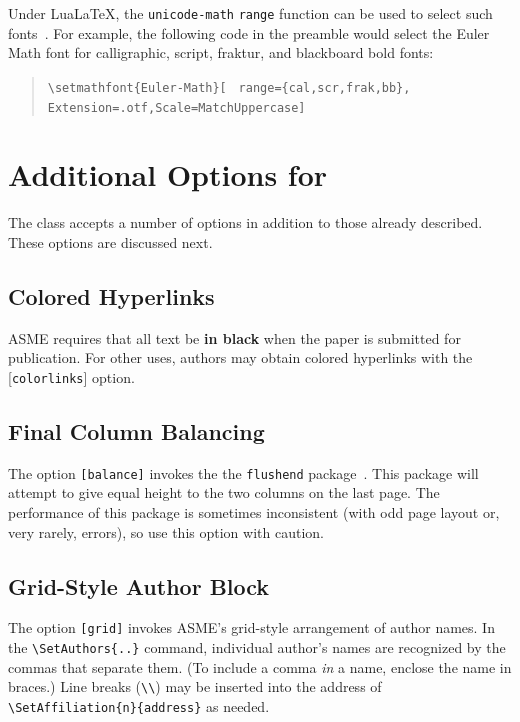 \documentclass[colorlinks,upint,subscriptcorrection,varvw,balance,loadscripts,german,vietamese]{asmeconf} %
\newcommand*\LuaLaTeX{Lua\LaTeX}
\begin{document}
Under \LuaLaTeX, the \texttt{unicode-math} \texttt{range} function can be used to select such fonts~\cite{robertson2023}. For example, the following code in the preamble would select the Euler Math font for calligraphic, script, fraktur, and blackboard bold fonts:
\begin{quote}\raggedright
\verb|\setmathfont{Euler-Math}[|
\verb| range={cal,scr,frak,bb},|
\verb| Extension=.otf,Scale=MatchUppercase]|
\end{quote}



\section{Additional Options for }
The class accepts a number of options in addition to those already described. These options are discussed next.

\subsection{Colored Hyperlinks}
ASME requires that all text be \textbf{in black} when the paper is submitted for publication.  For other uses, authors may
obtain colored hyperlinks with the [\texttt{colorlinks}] option.

\subsection{Final Column Balancing} The option \texttt{[balance]} invokes the the \texttt{flushend} package~\cite{tolusis}.
This package will attempt to give equal height to the two columns on the last page. The performance of this package is sometimes inconsistent (with odd page layout or, very rarely, errors), so use this option with caution.

\subsection{Grid-Style Author Block} The option \texttt{[grid]} invokes ASME's grid-style arrangement of author names. In the \verb|\SetAuthors{..}| command, individual author's names are recognized by the commas that separate them. (To include a comma \emph{in} a name, enclose the name in braces.) Line breaks (\verb|\\|) may be inserted into the address of \verb|\SetAffiliation{n}{address}| as needed. 
\end{document}
